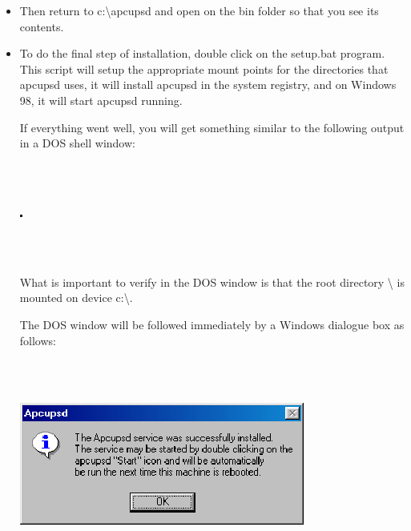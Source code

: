 {{{{{{{{{{\begin{itemize}
multi(0)disk(0)rdisk(0)partition(1)\textbackslash{}WINNT=``Windows NT
Workstation Version 4.00''  

and add the following to the end of the line: /NoSerialMice:COM1 (or COM2
depending on what you want to use). The new line should look similar to:  

multi(0)disk(0)rdisk(0)partition(1)\textbackslash{}WINNT=``Windows NT
Workstation Version 4.00'' /NoSerialMice:COM1  

where the only thing you have changed is to append to the end of the line.
This addition will prevent the operating system from interferring with apcupsd
 
\item Then return to c:\textbackslash{}apcupsd and open on the bin folder so
that you see its contents.  
\item To do the final step of installation, double click on the setup.bat
program. This script will setup the appropriate mount points for the
directories that apcupsd uses, it will install apcupsd in the system registry,
and on Windows 98, it will start apcupsd running.  

If everything went well, you will get something similar to the following
output in a DOS shell window:  

\footnotesize
\begin{verbatim}
     
     
\end{verbatim}
\normalsize

\includegraphics{./wininstall1.eps}  

\footnotesize
\begin{verbatim}
     
     
\end{verbatim}
\normalsize

What is important to verify in the DOS window is that the root directory
\textbackslash{} is mounted on device c:\textbackslash{}.  

The DOS window will be followed immediately by a Windows dialogue box as
follows:  

\footnotesize
\begin{verbatim}
     
     
\end{verbatim}
\normalsize

\includegraphics{./wininstall2.eps}  


\end{itemize}}}}}}}}}}}
